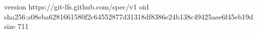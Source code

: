 version https://git-lfs.github.com/spec/v1
oid sha256:a08eba6281661580f2c64552877d31318df8386e24b138c49425aee6f45eb19d
size 711
